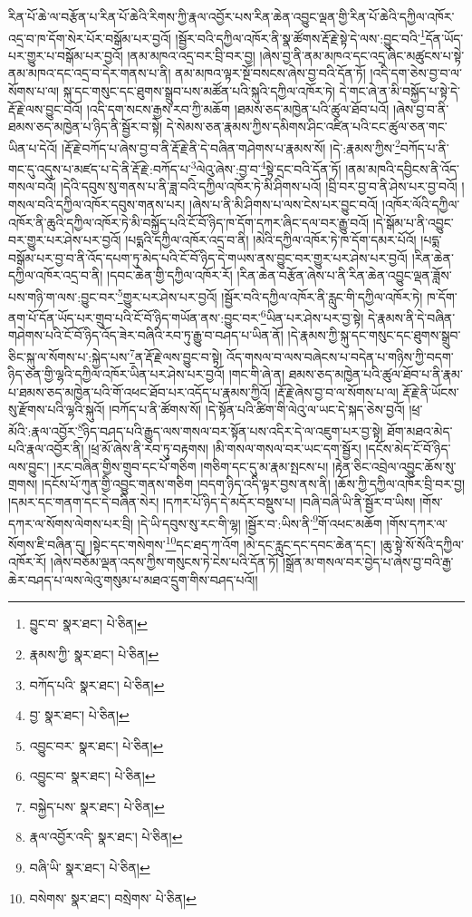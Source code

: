 རིན་པོ་ཆེ་ལ་བརྩོན་པ་རིན་པོ་ཆེའི་རིགས་ཀྱི་རྣལ་འབྱོར་པས་རིན་ཆེན་འབྱུང་ལྡན་གྱི་རིན་པོ་ཆེའི་དཀྱིལ་འཁོར་འདྲ་བ་ཁ་དོག་སེར་པོར་བསྒོམ་པར་བྱའོ། །སྦྱོར་བའི་དཀྱིལ་འཁོར་ནི་སྣ་ཚོགས་རྡོ་རྗེ་སྟེ་དེ་ལས་:བྱུང་བའི་\footnote{བྱུང་བ་  སྣར་ཐང་།  པེ་ཅིན། }དོན་ཡོད་པར་གྱུར་པ་བསྒོམ་པར་བྱའོ། །ནམ་མཁའ་འདྲ་བར་བྲི་བར་བྱ། །ཞེས་བྱ་ནི་ནམ་མཁའ་དང་འདྲ་ཞིང་མཚུངས་པ་སྟེ་ནམ་མཁའ་དང་འདྲ་བ་དེར་གནས་པ་ནི། ནམ་མཁའ་ལྟར་སྔོ་བསངས་ཞེས་བྱ་བའི་དོན་ཏོ། །འདི་དག་ཅེས་བྱ་བ་ལ་སོགས་པ་ལ། སྐུ་དང་གསུང་དང་ཐུགས་སྒྲུབ་པས་མཚོན་པའི་སྐུའི་དཀྱིལ་འཁོར་ཏེ། དེ་གང་ཞེ་ན་མི་བསྐྱོད་པ་སྟེ་དེ་རྡོ་རྗེ་ལས་བྱུང་བའོ། །འདི་དག་སངས་རྒྱས་རབ་ཀྱི་མཆོག །ཐམས་ཅད་མཁྱེན་པའི་ཚུལ་ཐོབ་པའོ། །ཞེས་བྱ་བ་ནི་ཐམས་ཅད་མཁྱེན་པ་ཉིད་ནི་སྦྱོར་བ་སྟེ། དེ་སེམས་ཅན་རྣམས་ཀྱིས་དམིགས་ཤིང་འཛིན་པའི་ངང་ཚུལ་ཅན་གང་ཡིན་པ་དེའོ། །རྡོ་རྗེ་བཀོད་པ་ཞེས་བྱ་བ་ནི་རྡོ་རྗེ་ནི་དེ་བཞིན་གཤེགས་པ་རྣམས་སོ། །དེ་:རྣམས་ཀྱིས་\footnote{རྣམས་ཀྱི་  སྣར་ཐང་།  པེ་ཅིན། }བཀོད་པ་ནི་གང་དུ་འདུས་པ་མཛད་པ་དེ་ནི་རྡོ་རྗེ་:བཀོད་པ་\footnote{བཀོད་པའི་  སྣར་ཐང་།  པེ་ཅིན། }ལེའུ་ཞེས་:བྱ་བ་\footnote{བྱ་  སྣར་ཐང་།  པེ་ཅིན། }སྟེ་དྲང་བའི་དོན་ཏོ། །ནམ་མཁའི་དབྱིངས་ནི་འོད་གསལ་བའོ། །དེའི་དབུས་སུ་གནས་པ་ནི་ཟླ་བའི་དཀྱིལ་འཁོར་ཏེ་མི་ཤིགས་པའོ། །བྲི་བར་བྱ་བ་ནི་ཤེས་པར་བྱ་བའོ། །གསལ་བའི་དཀྱིལ་འཁོར་དབུས་གནས་པར། །ཞེས་པ་ནི་མི་ཤིགས་པ་ལས་ངེས་པར་བྱུང་བའོ། །འཁོར་ལོའི་དཀྱིལ་འཁོར་ནི་ཆུའི་དཀྱིལ་འཁོར་ཏེ་མི་བསྐྱོད་པའི་ངོ་བོ་ཉིད་ཁ་དོག་དཀར་ཞིང་དལ་བར་རྒྱུ་བའོ། །དེ་སྒོམ་པ་ནི་འབྱུང་བར་གྱུར་པར་ཤེས་པར་བྱའོ། །པདྨའི་དཀྱིལ་འཁོར་འདྲ་བ་ནི། །མེའི་དཀྱིལ་འཁོར་ཏེ་ཁ་དོག་དམར་པོའོ། །པདྨ་བསྒོམ་པར་བྱ་བ་ནི་འོད་དཔག་ཏུ་མེད་པའི་ངོ་བོ་ཉིད་དེ་གཡས་ནས་བྱུང་བར་གྱུར་པར་ཤེས་པར་བྱའོ། །རིན་ཆེན་དཀྱིལ་འཁོར་འདྲ་བ་ནི། །དབང་ཆེན་གྱི་དཀྱིལ་འཁོར་རོ། །རིན་ཆེན་བརྩོན་ཞེས་པ་ནི་རིན་ཆེན་འབྱུང་ལྡན་ཟློས་པས་གཉི་ག་ལས་:བྱུང་བར་\footnote{འབྱུང་བར་  སྣར་ཐང་།  པེ་ཅིན། }གྱུར་པར་ཤེས་པར་བྱའོ། །སྦྱོར་བའི་དཀྱིལ་འཁོར་ནི་རླུང་གི་དཀྱིལ་འཁོར་ཏེ། ཁ་དོག་ནག་པོ་དོན་ཡོད་པར་གྲུབ་པའི་ངོ་བོ་ཉིད་གཡོན་ནས་:བྱུང་བར་\footnote{འབྱུང་བ་  སྣར་ཐང་།  པེ་ཅིན། }ཡིན་པར་ཤེས་པར་བྱ་སྟེ། དེ་རྣམས་ནི་དེ་བཞིན་གཤེགས་པའི་ངོ་བོ་ཉིད་འོད་ཟེར་བཞིའི་རབ་ཏུ་རྒྱུ་བ་བཤད་པ་ཡིན་ནོ། །དེ་རྣམས་ཀྱི་སྐུ་དང་གསུང་དང་ཐུགས་སྒྲུབ་ཅིང་སྐུ་ལ་སོགས་པ་:སྐྱེད་པས་\footnote{བསྐྱེད་པས་  སྣར་ཐང་།  པེ་ཅིན། }ན་རྡོ་རྗེ་ལས་བྱུང་བ་སྟེ། འོད་གསལ་བ་ལས་བཞེངས་པ་བདེན་པ་གཉིས་ཀྱི་བདག་ཉིད་ཅན་གྱི་ལྷའི་དཀྱིལ་འཁོར་ཡིན་པར་ཤེས་པར་བྱའོ། །གང་གི་ཞེ་ན། ཐམས་ཅད་མཁྱེན་པའི་ཚུལ་ཐོབ་པ་ནི་རྣམ་པ་ཐམས་ཅད་མཁྱེན་པའི་གོ་འཕང་ཐོབ་པར་འདོད་པ་རྣམས་ཀྱིའོ། །རྡོ་རྗེ་ཞེས་བྱ་བ་ལ་སོགས་པ་ལ། རྡོ་རྗེ་ནི་ཡོངས་སུ་རྫོགས་པའི་ལྷའི་སྐུའོ། །བཀོད་པ་ནི་ཚོགས་སོ། །དེ་སྟོན་པའི་ཚིག་གི་ལེའུ་ལ་ཡང་དེ་སྐད་ཅེས་བྱའོ། །ཕྲ་མོའི་:རྣལ་འབྱོར་\footnote{རྣལ་འབྱོར་འདི་  སྣར་ཐང་།  པེ་ཅིན། }ཉིད་བཤད་པའི་རྒྱུད་ལས་གསལ་བར་སྟོན་པས་འདིར་དེ་ལ་འཇུག་པར་བྱ་སྟེ། ཐོག་མཐའ་མེད་པའི་རྣལ་འབྱོར་ནི། །ཕྲ་མོ་ཞེས་ནི་རབ་ཏུ་བརྟགས། །མི་གསལ་གསལ་བར་ཡང་དག་སྦྱོར། །དངོས་མེད་ངོ་བོ་ཉིད་ལས་བྱུང་། །རང་བཞིན་གྱིས་གྲུབ་དང་པོ་གཅིག །གཅིག་དང་དུ་མ་རྣམ་སྤངས་པ། །རྟེན་ཅིང་འབྲེལ་འབྱུང་ཆོས་སུ་གྲགས། །དངོས་པོ་ཀུན་གྱི་འབྱུང་གནས་གཅིག །བདག་ཉིད་འདི་ལྟར་བྱས་ནས་ནི། །ཆོས་ཀྱི་དཀྱིལ་འཁོར་བྲི་བར་བྱ། །དམར་དང་གནག་དང་དེ་བཞིན་སེར། །དཀར་པོ་ཉིད་དེ་མདོར་བསྡུས་པ། །བཞི་བཞི་ཡི་ནི་སྦྱོར་བ་ཡིས། །གོས་དཀར་ལ་སོགས་ལེགས་པར་བྲི། །དེ་ཡི་དབུས་སུ་རང་གི་ལྷ། །སྦྱོར་བ་:ཡིས་ནི་\footnote{བཞི་ཡི་  སྣར་ཐང་།  པེ་ཅིན། }གོ་འཕང་མཆོག །གོས་དཀར་ལ་སོགས་ཇི་བཞིན་དུ། །སྟེང་དང་གསེགས་\footnote{བསེགས་  སྣར་ཐང་། བསྲེགས་  པེ་ཅིན། }དང་ཐད་ཀ་འོག །མེ་དང་རླུང་དང་དབང་ཆེན་དང་། །ཆུ་སྟེ་སོ་སོའི་དཀྱིལ་འཁོར་རོ། །ཞེས་བཅོམ་ལྡན་འདས་ཀྱིས་གསུངས་ཏེ་ངེས་པའི་དོན་ཏོ། །སྒྲོན་མ་གསལ་བར་བྱེད་པ་ཞེས་བྱ་བའི་རྒྱ་ཆེར་བཤད་པ་ལས་ལེའུ་གསུམ་པ་མཐའ་དྲུག་གིས་བཤད་པའོ།། 